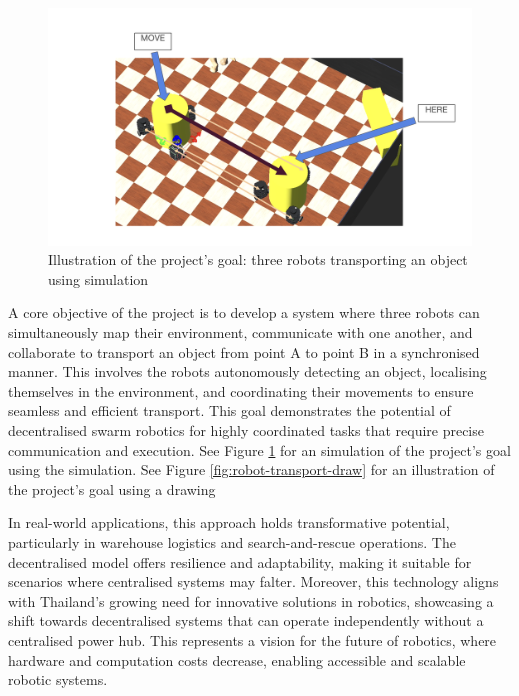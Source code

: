 \begin{figure}
    \centering
    \includegraphics[width=1.0\linewidth]{assets/images/introduction/robot-transport-sim.png}
    \caption{Illustration of the project's goal: three robots transporting an object using simulation}
    \label{fig:robot-transport-sim}
\end{figure}
A core objective of the project is to develop a system where three robots can simultaneously map their environment, communicate with one another, and collaborate to transport an object from point A to point B in a synchronised manner. This involves the robots autonomously detecting an object, localising themselves in the environment, and coordinating their movements to ensure seamless and efficient transport. This goal demonstrates the potential of decentralised swarm robotics for highly coordinated tasks that require precise communication and execution. See Figure \ref{fig:robot-transport-sim} for an simulation of the project's goal using the simulation.
See Figure \ref{fig:robot-transport-draw} for an illustration of the project's goal using a drawing 




In real-world applications, this approach holds transformative potential, particularly in warehouse logistics and search-and-rescue operations. The decentralised model offers resilience and adaptability, making it suitable for scenarios where centralised systems may falter. Moreover, this technology aligns with Thailand’s growing need for innovative solutions in robotics, showcasing a shift towards decentralised systems that can operate independently without a centralised power hub. This represents a vision for the future of robotics, where hardware and computation costs decrease, enabling accessible and scalable robotic systems.

